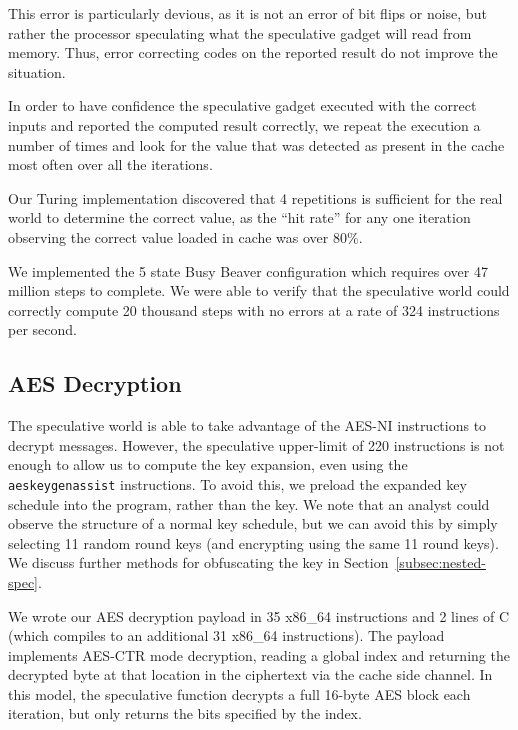 This error is particularly devious, as it is not an
error of bit flips or noise, but rather the processor speculating what the
speculative gadget will read from memory. Thus, error correcting codes on
the reported result do not improve the situation.



In order to have confidence the speculative gadget executed with the
correct inputs and reported the computed result correctly, 
we repeat the execution a number of times and look for the value that was
detected as present in the cache most often over all the iterations.

Our Turing implementation discovered that 4 repetitions is sufficient for the
real world to determine the correct value, as the ``hit rate'' for any one
iteration observing the correct value loaded in cache was over 80\%.

We implemented the 5 state Busy Beaver configuration which requires over 47
million steps to complete. We were able to verify that the speculative world
could correctly compute 20 thousand steps with no errors at a rate of 324
instructions per second.



\subsection{AES Decryption}
\label{subsec:impl-aes}
The speculative world is able to take advantage of the AES-NI instructions to
decrypt messages. However, the speculative upper-limit of 220 instructions is not
enough to allow us to compute the key expansion, even using the
\texttt{aeskeygenassist} instructions. To avoid this, we preload the expanded
key schedule into the program, rather than the key. We note that an analyst
could observe the structure of a normal key schedule,
but we can avoid this by simply selecting 11 random round keys (and encrypting
using the same 11 round keys). We discuss further methods for obfuscating
the key in Section~\ref{subsec:nested-spec}.


We wrote our AES decryption payload in 35 x86\_64 instructions and 2 lines of C
(which compiles to an additional 31 x86\_64 instructions). The payload
implements AES-CTR mode decryption, reading a global index and returning the
decrypted byte at that location in the ciphertext via the cache side channel.
In this model, the speculative function decrypts a full 16-byte AES block each
iteration, but only returns the bits specified by the index.

